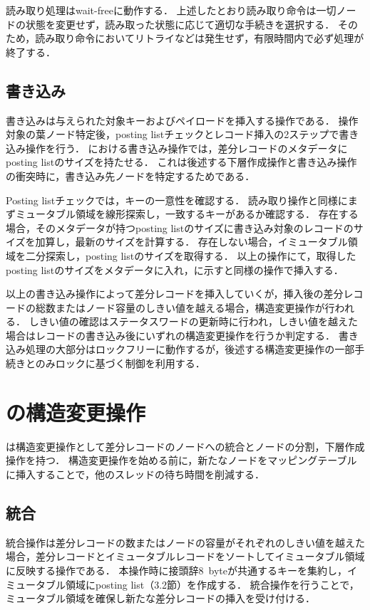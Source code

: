 読み取り処理はwait-freeに動作する．
上述したとおり読み取り命令は一切ノードの状態を変更せず，読み取った状態に応じて適切な手続きを選択する．
そのため，読み取り命令においてリトライなどは発生せず，有限時間内で必ず処理が終了する．

\subsection{書き込み}
書き込みは与えられた対象キーおよびペイロードを挿入する操作である．
操作対象の葉ノード特定後，posting listチェックとレコード挿入の2ステップで書き込み操作を行う．
\Bcforest{}における書き込み操作では，差分レコードのメタデータにposting listのサイズを持たせる．
これは後述する下層作成操作と書き込み操作の衝突時に，書き込み先ノードを特定するためである．

Posting listチェックでは，キーの一意性を確認する．
読み取り操作と同様にまずミュータブル領域を線形探索し，一致するキーがあるか確認する．
存在する場合，そのメタデータが持つposting listのサイズに書き込み対象のレコードのサイズを加算し，最新のサイズを計算する．
存在しない場合，イミュータブル領域を二分探索し，posting listのサイズを取得する．
以上の操作にて，取得したposting listのサイズをメタデータに入れ，\Fig{\ref{fig:bc_tree_insertion}}に示す\Bctree{}と同様の操作で挿入する．

以上の書き込み操作によって差分レコードを挿入していくが，挿入後の差分レコードの総数またはノード容量のしきい値を越える場合，構造変更操作が行われる．
しきい値の確認はステータスワードの更新時に行われ，しきい値を越えた場合はレコードの書き込み後にいずれの構造変更操作を行うか判定する．
書き込み処理の大部分はロックフリーに動作するが，後述する構造変更操作の一部手続きとのみロックに基づく制御を利用する．

\section{\Bcforest{}の構造変更操作}
\label{sec:smo}
\Bcforest{}は構造変更操作として差分レコードのノードへの統合とノードの分割，下層作成操作を持つ．
構造変更操作を始める前に，新たなノードをマッピングテーブルに挿入することで，他のスレッドの待ち時間を削減する．

\subsection{統合}
統合操作は差分レコードの数またはノードの容量がそれぞれのしきい値を越えた場合，差分レコードとイミュータブルレコードをソートしてイミュータブル領域に反映する操作である．
本操作時に接頭辞8~byteが共通するキーを集約し，イミュータブル領域にposting list（3.2節）を作成する．
統合操作を行うことで，ミュータブル領域を確保し新たな差分レコードの挿入を受け付ける．

